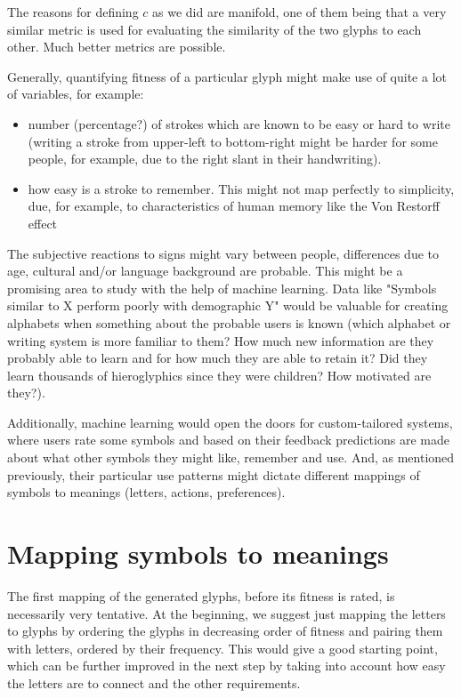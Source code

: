 \documentclass[conference]{IEEEtran}
\begin{document}
The reasons for defining \(c\) as we did are manifold, one of them being that a very similar metric is used for evaluating the similarity of the two glyphs to each other. Much better metrics are possible.

Generally, quantifying fitness of a particular glyph might make use of quite a lot of variables, for example:
\begin{itemize}
        \item number (percentage?) of strokes which are known to be easy or hard to write (writing a stroke from upper-left to bottom-right might be harder for some people, for example, due to the right slant in their handwriting). 
        \item how easy is a stroke to remember. This might not map perfectly to simplicity, due, for example, to characteristics of human memory like the Von Restorff effect~\citep{hunt1995subtlety}
\end{itemize}
	The subjective reactions to signs might vary between people, differences due to age, cultural and/or language background are probable. This might be a promising area to study with the help of machine learning. Data like "Symbols similar to X perform poorly with demographic Y" would be valuable for creating alphabets when something about the probable users is known (which alphabet or writing system is more familiar to them? How much new information are they probably able to learn and for how much they are able to retain it? Did they learn thousands of hieroglyphics since they were children? How motivated are they?). 

Additionally, machine learning would open the doors for custom-tailored systems, where users rate some symbols and based on their feedback predictions are made about what other symbols they might like, remember and use. And, as mentioned previously, their particular use patterns might dictate different mappings of symbols to meanings (letters, actions, preferences). 
\section{Mapping symbols to meanings}
The first mapping of the generated glyphs, before its fitness is rated, is necessarily very tentative. At the beginning, we suggest just mapping the letters to glyphs by ordering the glyphs in decreasing order of fitness and pairing them with letters, ordered by their frequency. This would give a good starting point, which can be further improved in the next step by taking into account how easy the letters are to connect and the other requirements. 
\end{document}
